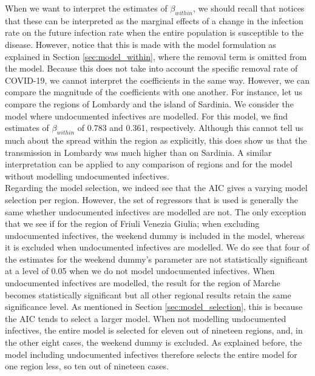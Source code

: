 \documentclass[12pt]{article}
\begin{document}
    When we want to interpret the estimates of $\beta_{within}$, we should recall that \textcite{adda2016economic} notices that these can be interpreted as the marginal effects of a change in the infection rate on the future infection rate when the entire population is susceptible to the disease. However, notice that this is made with the model formulation as explained in Section \ref{sec:model_within}, where the removal term is omitted from the model. Because this does not take into account the specific removal rate of COVID-19, we cannot interpret the coefficients in the same way. However, we can compare the magnitude of the coefficients with one another. For instance, let us compare the regions of Lombardy and the island of Sardinia. We consider the model where undocumented infectives are modelled. For this model, we find estimates of $\beta_{within}$ of 0.783 and 0.361, respectively. Although this cannot tell us much about the spread within the region as explicitly, this does show us that the transmission in Lombardy was much higher than on Sardinia. A similar interpretation can be applied to any comparison of regions and for the model without modelling undocumented infectives. \\

    Regarding the model selection, we indeed see that the AIC gives a varying model selection per region. However, the set of regressors that is used is generally the same whether undocumented infectives are modelled are not. The only exception that we see if for the region of Friuli Venezia Giulia; when excluding undocumented infectives, the weekend dummy is included in the model, whereas it is excluded when undocumented infectives are modelled. We do see that four of the estimates for the weekend dummy's parameter are not statistically significant at a level of 0.05 when we do not model undocumented infectives. When undocumented infectives are modelled, the result for the region of Marche becomes statistically significant but all other regional results retain the same significance level. As mentioned in Section \ref{sec:model_selection}, this is because the AIC tends to select a larger model. When not modelling undocumented infectives, the entire model is selected for eleven out of nineteen regions, and, in the other eight cases, the weekend dummy is excluded. As explained before, the model including undocumented infectives therefore selects the entire model for one region less, so ten out of nineteen cases. \\
	
\end{document}
